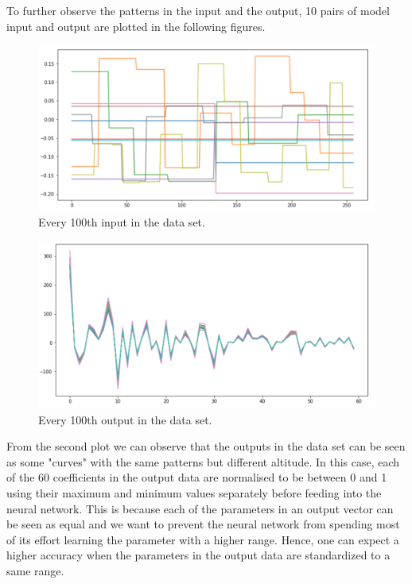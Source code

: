 To further observe the patterns in the input and the output, 10 pairs of model input and output are plotted in the following figures.

\begin{figure}[H]
    \caption{Every 100th input in the data set.}
    \includegraphics[scale=0.6]{figures/geoid_images/Geoid_sample_input.png}
\end{figure}

\begin{figure}[H]
    \caption{Every 100th output in the data set.}
    \includegraphics[scale=0.6]{figures/geoid_images/Geoid_sample_output.png}
\end{figure}

From the second plot we can observe that the outputs in the data set can be seen as some "curves" with the same patterns but different altitude. In this case, each of the 60 coefficients in the output data are normalised to be between 0 and 1 using their maximum and minimum values separately before feeding into the neural network. This is because each of the parameters in an output vector can be seen as equal and we want to prevent the neural network from spending most of its effort learning the parameter with a higher range. Hence, one can expect a higher accuracy when the parameters in the output data are standardized to a same range.

